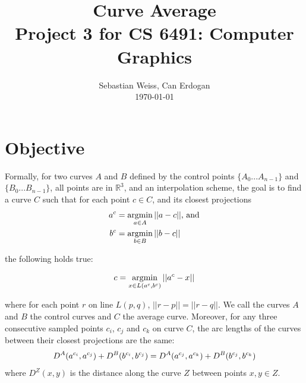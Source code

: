 \documentclass[journal, letterpaper]{IEEEtran}
\begin{document}
\title{Curve Average \\
	{\large Project 3 for CS 6491: Computer Graphics}}
\author{Sebastian Weiss, Can Erdogan \\ \today}

\maketitle


\section{Objective}
Formally, for two curves $A$ and $B$ defined by the control points $\{A_0 ... A_{n-1}\}$ and $\{B_0 ... B_{n-1}\}$, all points are in $\mathbb{R}^3$, and an interpolation scheme,
the goal is to find a curve $C$ such that for each point $c \in C$, and its closest projections
\begin{align}
a^c &= \operatornamewithlimits{argmin}\limits_{a \in A} ||a-c|| \text{, and} \\
b^c &= \operatornamewithlimits{argmin}\limits_{b \in B} ||b-c||
\end{align}

\noindent the following holds true:

\begin{equation}
 c = \operatornamewithlimits{argmin}\limits_{x \in L(a^c, b^c)} ||a^c-x||
\end{equation}

\noindent where for each point $r$ on line $L(p,q)$, $||r-p|| = ||r-q||$. We call the curves $A$ and $B$ the control curves and $C$ the average curve.
Moreover, for any three consecutive sampled points $c_i$, $c_j$ and $c_k$ on curve $C$, the arc lengths
of the curves between their closest projections are the same:
\begin{equation}
\small
 D^A(a^{c_i},a^{c_j}) + D^B(b^{c_i},b^{c_j}) = D^A(a^{c_j},a^{c_k}) + D^B(b^{c_j},b^{c_k})
\end{equation}
\noindent where $D^Z(x,y)$ is the distance along the curve $Z$ between points $x,y \in Z$.
\end{document}
